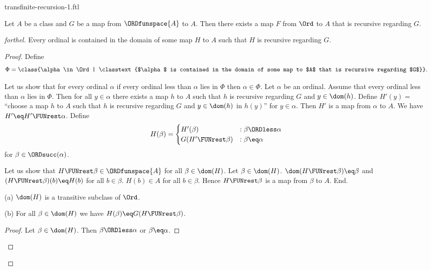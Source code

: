 \documentclass{naproche-library}
\begin{document}
\begin{smodule}[title=Transfinite Recursion I]{transfinite-recursion-1.ftl}
  
\begin{theorem}[forthel,title=Transfinite Recursion Theorem: Existence,id=transfinite-recursion_existence]
  Let $A$ be a class and $G$ be a map from $\ORDfunspace{A}$ to $A$.
  Then there exists a map $F$ from $\Ord$ to $A$ that is recursive regarding $G$.
\end{theorem}
\begin{proof}[forthel]
  Every ordinal is contained in the domain of some map $H$ to $A$ such that $H$ is recursive regarding $G$.
  \begin{proof}
    Define \[ \Phi = \class{\alpha \in \Ord | \classtext{$\alpha$ is contained in the domain of some map to $A$ that is recursive regarding $G$}}. \]

    Let us show that for every ordinal $\alpha$ if every ordinal less than $\alpha$ lies in $\Phi$ then $\alpha \in \Phi$.
      Let $\alpha$ be an ordinal.
      Assume that every ordinal less than $\alpha$ lies in $\Phi$.
      Then for all $y \in \alpha$ there exists a map $h$ to $A$ such that $h$ is recursive regarding $G$ and $y \in \dom(h)$.
      Define $H'(y) =$ ``choose a map $h$ to $A$ such that $h$ is recursive regarding $G$ and $y \in \dom(h)$ in $h(y)$'' for $y \in \alpha$.
      Then $H'$ is a map from $\alpha$ to $A$.
      We have $H' \eq H' \FUNrest \alpha$.
      Define \[ H(\beta) =
        \begin{cases}
          H'(\beta)                 & : \beta \ORDless \alpha \\
          G(H' \FUNrest \beta)  & : \beta \eq \alpha
        \end{cases} \]
      for $\beta \in \ORDsucc(\alpha)$.
      
      Let us show that $H \FUNrest \beta \in \ORDfunspace{A}$ for all $\beta \in \dom(H)$.
        Let $\beta \in \dom(H)$.
        $\dom(H \FUNrest \beta) \eq \beta$ and $(H \FUNrest \beta)(b) \eq H(b)$ for all $b \in \beta$.
        $H(b) \in A$ for all $b \in \beta$.
        Hence $H \FUNrest \beta$ is a map from $\beta$ to $A$.
      End.

      (a) $\dom(H)$ is a transitive subclass of $\Ord$.

      (b) For all $\beta \in \dom(H)$ we have $H(\beta) \eq G(H \FUNrest \beta)$.
      \begin{proof}
        Let $\beta \in \dom(H)$.
        Then $\beta \ORDless \alpha$ or $\beta \eq \alpha$.


\end{proof}
\end{proof}
\end{proof}
\end{smodule}
\end{document}
